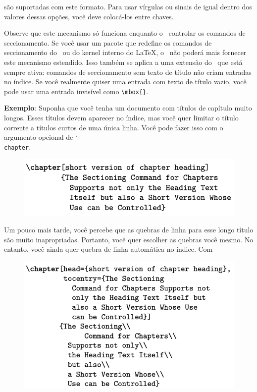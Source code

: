 são suportadas com este formato. Para usar vírgulas ou sinais de igual dentro dos valores dessas opções, você deve colocá-los entre chaves.

Observe que este mecanismo só funciona enquanto o \KOMAScript\ controlar os comandos de seccionamento. Se você usar um pacote que redefine os comandos de seccionamento do \KOMAScript\ ou do kernel interno do \LaTeX, o \KOMAScript\ não poderá mais fornecer este mecanismo estendido. Isso também se aplica a uma extensão do \KOMAScript\ que está sempre ativa: comandos de seccionamento sem texto de título não criam entradas no índice. Se você realmente quiser uma entrada com texto de título vazio, você pode usar uma entrada invisível como \verb|\mbox{}|.

\textbf{Exemplo}: Suponha que você tenha um documento com títulos de capítulo muito longos. Esses títulos devem aparecer no índice, mas você quer limitar o título corrente a títulos curtos de uma única linha. Você pode fazer isso com o argumento opcional de \char`\\\texttt{chap\-ter}.

\begin{figure}[h]
    \centering
    \includegraphics[width=0.60\linewidth]{imagens/imagem14.png}
    \label{fig:img14}
\end{figure}

Um pouco mais tarde, você percebe que as quebras de linha para esse longo título são muito inapropriadas. Portanto, você quer escolher as quebras você mesmo. No entanto, você ainda quer quebra de linha automática no índice. Com
\begin{figure}[h]
    \centering
    \includegraphics[width=0.60\linewidth]{imagens/imagem19.png}
    \label{fig:img19}
\end{figure}

